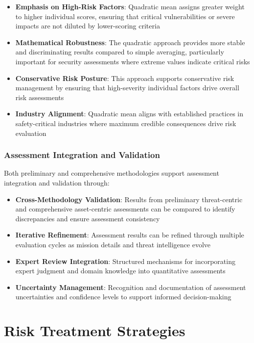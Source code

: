 \documentclass[binding=0.6cm]{sapthesis}
\begin{document}
\begin{itemize}
    \item \textbf{Emphasis on High-Risk Factors}: Quadratic mean assigns greater weight to higher individual scores, ensuring that critical vulnerabilities or severe impacts are not diluted by lower-scoring criteria
    \item \textbf{Mathematical Robustness}: The quadratic approach provides more stable and discriminating results compared to simple averaging, particularly important for security assessments where extreme values indicate critical risks
    \item \textbf{Conservative Risk Posture}: This approach supports conservative risk management by ensuring that high-severity individual factors drive overall risk assessments
    \item \textbf{Industry Alignment}: Quadratic mean aligns with established practices in safety-critical industries where maximum credible consequences drive risk evaluation
\end{itemize}

\subsubsection{Assessment Integration and Validation}

Both preliminary and comprehensive methodologies support assessment integration and validation through:

\begin{itemize}
    \item \textbf{Cross-Methodology Validation}: Results from preliminary threat-centric and comprehensive asset-centric assessments can be compared to identify discrepancies and ensure assessment consistency
    \item \textbf{Iterative Refinement}: Assessment results can be refined through multiple evaluation cycles as mission details and threat intelligence evolve
    \item \textbf{Expert Review Integration}: Structured mechanisms for incorporating expert judgment and domain knowledge into quantitative assessments
    \item \textbf{Uncertainty Management}: Recognition and documentation of assessment uncertainties and confidence levels to support informed decision-making

\end{itemize}

\section{Risk Treatment Strategies}
\end{document}
